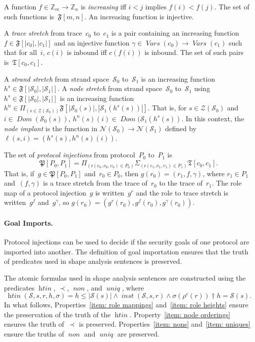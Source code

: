 \documentclass[12pt]{article}
\newcommand{\fn}[1]{\ensuremath{\operatorname{\mathit{#1}}}}
\newcommand{\sdom}{\fn{Dom}}
\newcommand{\vars}{\fn{Vars}}
\newcommand{\prefix}[2]{#1\dagger#2}
\newcommand{\zed}{\ensuremath{\mathbb{Z}}}
\newcommand{\dprod}[1]{\Pi_{(#1)}}
\newcommand{\dpair}[1]{\Sigma_{(#1)}}
\newcommand{\alg}[1]{\ensuremath{\mathfrak{#1}}}
\newcommand{\ssp}{\ensuremath{\mathcal{S}}}
\newcommand{\strands}{\ensuremath{\mathcal{Z}}}
\newcommand{\nodes}{\ensuremath{\mathcal{N}}}
\newcommand{\role}{\mathsf{r}}
\begin{document}
A function $f\in\zed_m\to\zed_n$ is \emph{increasing} iff $i<j$
implies $f(i)<f(j)$.  The set of such functions is~$\alg{F}[m,n]$.  An
increasing function is injective.

A \emph{trace stretch} from trace~$c_0$ to~$c_1$ is a pair containing
an increasing function $f\in\alg{F}[|c_0|, |c_1|]$ and an injective
function $\gamma\in\vars(c_0)\to\vars(c_1)$ such that for
all~$i$, $c(i)$ is inbound iff $c(f(i))$ is inbound.  The set of such
pairs is~$\alg{T}[c_0,c_1]$.

A \emph{strand stretch} from strand space~$\ssp_0$ to~$\ssp_1$ is an
increasing function $h^s\in\alg{F}[|\ssp_0|, |\ssp_1|]$.  A \emph{node
  stretch} from strand space~$\ssp_0$ to~$\ssp_1$ using
$h^s\in\alg{F}[|\ssp_0|, |\ssp_1|]$ is an increasing function
$h^n\in\dprod{s\in\strands(\ssp_0)}\alg{F}[|\ssp_0(s)|,
  |\ssp_1(h^s(s))|]$.  That is, for $s\in\strands(\ssp_0)$ and
$i\in\sdom(\ssp_0(s))$, $h^n(s)(i)\in\sdom(\ssp_1(h^s(s))$.  In this
context, the \emph{node implant} is the function in
$\nodes(\ssp_0)\to\nodes(\ssp_1)$ defined by
$\ell(s,i)=(h^s(s), h^n(s)(i))$.

The set of \emph{protocol injections} from protocol~$P_0$ to~$P_1$ is
\[\alg{P}[P_0,P_1]=\dprod{\role(c_0,\nu_0,\upsilon_0)\in
  P_0}\dpair{\role(c_1,\nu_1,\upsilon_1)\in P_1}\alg{T}[c_0,c_1].\]
That is, if~$g\in\alg{P}[P_0,P_1]$ and~$r_0\in P_0$, then
$g(r_0)=(r_1,f,\gamma)$, where $r_1\in P_1$ and~$(f,\gamma)$ is a
trace stretch from the trace of~$r_0$ to the trace of~$r_1$.  The role
map of a protocol injection~$g$ is written~$g^r$ and the role to trace
stretch is written~$g^f$ and~$g^\gamma$, so $g(r_0)=(g^r(r_0),
g^f(r_0),g^\gamma(r_0))$.

\paragraph{Goal Imports.}
Protocol injections can be used to decide if the security goals of one
protocol are imported into another.  The definition of goal
importation ensures that the truth of predicates used in shape
analysis sentences is preserved.

The atomic formulas used in shape analysis sentences are constructed
using the predicates \fn{htin}, $\prec$, \fn{non}, and \fn{uniq},
where 
\[\fn{htin}(\ssp,s,r,h,\sigma)=h\leq|\ssp(s)|\land\fn{inst}(\ssp,s,r)
\land\prefix{\sigma(\rho^c(r))}{h}=\ssp(s).\]
In what follows, Properties~\ref{item: role mappings} and~\ref{item:
  role heights} ensure the preservation of the truth of the \fn{htin}.
Property~\ref{item: node orderings} ensures the truth of~$\prec$ is
preserved.  Properties~\ref{item: nons} and~\ref{item: uniques} ensure
the truths of \fn{non} and \fn{uniq} are preserved.
\end{document}

